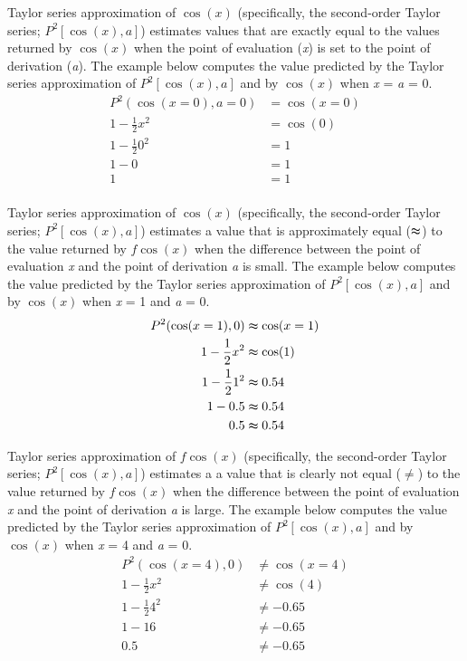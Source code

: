 \documentclass[
12pt, %
twoside,
english]{guelphthesis}
\begin{document}
\textup{Taylor series approximation of $\cos(x)$ (specifically, the second-order Taylor series; $P^2[\cos(x), a]$) estimates values that are exactly equal to the values returned by $\cos(x)$ when the point of evaluation (\textit{x}) is set to the point of derivation (\textit{a}). The example below computes the value predicted by the Taylor series approximation of $P^2[\cos(x), a]$ and by $\cos(x)$ when \textit{x} = \textit{a} = 0.}
\begin{align*}
P^2(\cos(x=0), a=0) &= \cos(x=0) \nonumber \\ 
1- \frac{1}{2}x^2 &=  \cos(0) \nonumber \\ 
1- \frac{1}{2}0^2 &=  1 \nonumber \\ 
1- 0 &=  1 \nonumber \\ 
1 &=  1 \nonumber \\ 
\end{align*}
\vspace*{-25mm}

\textup{Taylor series approximation of $\cos(x)$ (specifically, the second-order Taylor series; $P^2[\cos(x), a]$) estimates a value that is approximately equal ($\thickapprox$) to the value returned by $f\cos(x)$ when the difference between the point of evaluation \textit{x} and the point of derivation \textit{a} is small. The example below computes the value predicted by the Taylor series approximation of $P^2[\cos(x), a]$ and by $\cos(x)$ when \textit{x} = 1 and  \textit{a} = 0.}
\begin{align*}
P^2(\cos(x = 1), 0) &\thickapprox \cos(x = 1) \nonumber \\ 
1- \frac{1}{2}x^2 &\thickapprox   \cos(1) \nonumber \\ 
1- \frac{1}{2}1^2 &\thickapprox   0.54 \nonumber \\ 
1- 0.5 &\thickapprox   0.54 \nonumber \\ 
0.5 &\thickapprox 0.54 \nonumber \\ 
\end{align*}
\vspace*{-25mm}

\textup{Taylor series approximation of $f\cos(x)$ (specifically, the second-order Taylor series; $P^2[\cos(x), a]$) estimates a a value that is clearly not equal ($\neq$) to the value returned by $f\cos(x)$ when the difference between the point of evaluation \textit{x} and the point of derivation \textit{a} is large. The example below computes the value predicted by the Taylor series approximation of $P^2[\cos(x), a]$ and by $\cos(x)$ when \textit{x} = 4 and  \textit{a} = 0.}
\begin{align*}
P^2(\cos(x = 4), 0) &\neq \cos(x = 4) \nonumber \\ 
1- \frac{1}{2}x^2 &\neq  \cos(4) \nonumber \\ 
1- \frac{1}{2}4^2 &\neq  -0.65 \nonumber \\ 
1- 16 &\neq  -0.65 \nonumber \\ 
0.5 &\neq  -0.65 \nonumber \\ 
\end{align*}
\vspace*{-25mm}
\end{document}

